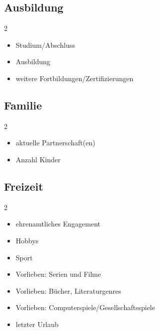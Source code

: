 \subsection{Ausbildung}

\begin{multicols}{2}
    \begin{itemize}
        \item Studium/Abschluss
        \item Ausbildung
        \item weitere Fortbildungen/Zertifizierungen
    \end{itemize}
\end{multicols}

\subsection{Familie}

\begin{multicols}{2}
    \begin{itemize}
        \item aktuelle Partnerschaft(en)
        \item Anzahl Kinder
    \end{itemize}
\end{multicols}

\subsection{Freizeit}

\begin{multicols}{2}
    \begin{itemize}
        \item ehrenamtliches Engagement
        \item Hobbys
        \item Sport
        \item Vorlieben: Serien und Filme
        \item Vorlieben: Bücher, Literaturgenres
        \item Vorlieben: Computerspiele/Gesellschaftsspiele
        \item letzter Urlaub
    \end{itemize}
\end{multicols}
